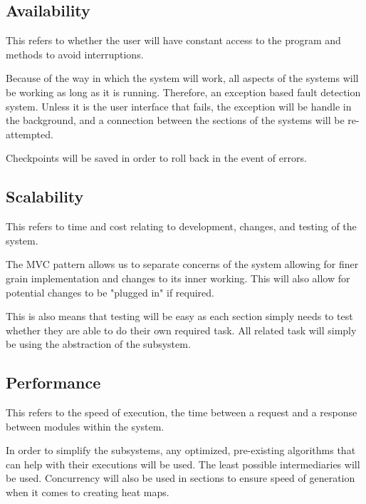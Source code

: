 \subsection{Availability}
This refers to whether the user will have constant access to the program and methods to avoid interruptions.

Because of the way in which the system will work, all aspects of the systems will be working as long as it is running. Therefore, an exception based fault detection system. Unless it is the user interface that fails, the exception will be handle in the background, and a connection between the sections of the systems will be re-attempted.

Checkpoints will be saved in order to roll back in the event of errors.

\subsection{Scalability}
This refers to time and cost relating to development, changes, and testing of the system.

The MVC pattern allows us to separate concerns of the system allowing for finer grain implementation and changes to its inner working. This will also allow for potential changes to be "plugged in" if required.

This is also means that testing will be easy as each section simply needs to test whether they are able to do their own required task. All related task will simply be using the abstraction of the subsystem.

\subsection{Performance}
This refers to the speed of execution, the time between a request and a response between modules within the system.

In order to simplify the subsystems, any optimized, pre-existing algorithms that can help with their executions will be used. The least possible intermediaries will be used. Concurrency will also be used in sections to ensure speed of generation when it comes to creating heat maps.
\iffalse
\subsection{Security}
This refers to the safety of the data that the system will be used.

The system is to be designed in such a way that no users can interfere with the inner workings of the subsystems. The overall purpose of this systems is to provide extra functionality to a device and so, changes to how it works are not required.
\fi
